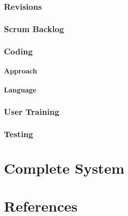 \documentclass{article}
\begin{document}
\subsubsection{Revisions}
\subsubsection{Scrum Backlog } %
\subsubsection{Coding}
\paragraph{Approach}
\paragraph{Language}
\subsubsection{User Training}
\subsubsection{Testing}
\section{Complete System}

\section{References}



\end{document}
